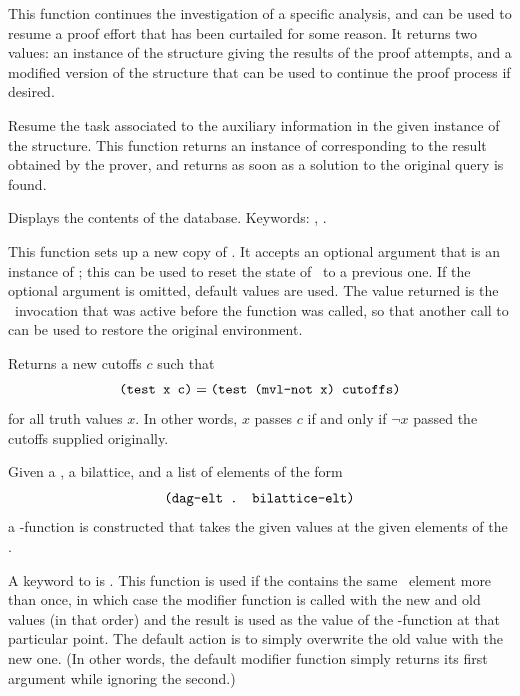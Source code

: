 \begin{list}{}{\setlength{\labelwidth}{1.5in}\setlength{\labelsep}{.25in}
\setlength{\leftmargin}{1.75in}}
\item [\itype{cont-analysis(analysis)}] This function continues the
investigation of a specific analysis, and can be used to resume a
proof effort that has been curtailed for some reason.  It returns two
values: an instance of the  structure giving the results
of the proof attempts, and a modified version of the 
structure that can be used to continue the proof process if desired.

\item [\itype{cont-prover(proof)}] Resume the task associated to the
auxiliary information in the given instance of the 
structure.  This function returns an instance of 
corresponding to the result obtained by the prover, and returns as
soon as a solution to the original query is found.

\item [\itype{contents}] Displays the contents of the database.  Keywords:
, .

\item [\itype{create-mvl-invocation}] This function sets up a new
copy of \mvl.  It accepts an optional argument that is an instance of
\mi; this can be used to reset the state of \mvl\ to a previous one.
If the optional argument is omitted, default values are used.  The
value returned is the \mvl\ invocation that was active before the
function was called, so that another call to
 can be used to restore the original
environment.

\item [\itype{cutoffs-not(cutoffs \&optional bilattice)}] Returns a
new cutoffs $c$ such that
 \[\mbox{\tt (test x c)} = \mbox{\tt (test (mvl-not x) cutoffs)}\]
 for all truth values $x$.  In other words, $x$ passes $c$ if and
only if $\neg x$ passed the cutoffs supplied originally.


\item [\itype{dag-accumulate-fn(dag bilattice list)}] Given a \dg, a
bilattice, and a list of elements of the form
 \[\mbox{\tt (dag-elt . bilattice-elt)}\]
a \dg-function is constructed that takes the given values at the
given elements of the \dg.

A keyword to  is .  This
function is used if the  contains the same \dg\ element
more than once, in which case the modifier function is called with
the new and old values (in that order) and the result is used as the
value of the \dg-function at that particular point.  The default
action is to simply overwrite the old value with the new one.  (In
other words, the default modifier function simply returns its first
argument while ignoring the second.)


\end{list}
